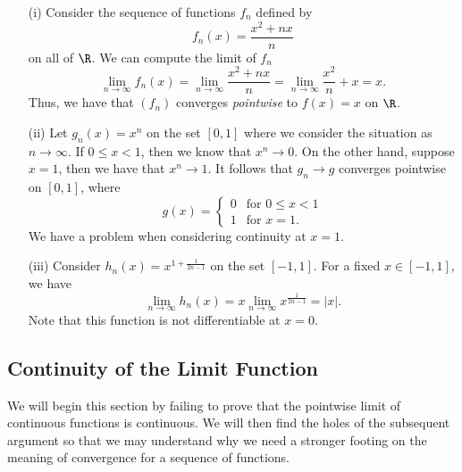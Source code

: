 \begin{ex}
\begin{enumerate}
    \item[(i)] Consider the sequence of functions \( f_n  \) defined by 
        \[  f_n(x) = \frac{ x^2 + nx  }{ n } \]
        on all of \( \R  \). We can compute the limit of \( f_n  \)
        \[  \lim_{ n \to \infty  } f_n(x) = \lim_{ n \to \infty  } \frac{ x^2 + nx  }{ n  } = \lim_{ n \to \infty  } \frac{ x^2  }{ n } + x  = x. \] Thus, we have that \( (f_n) \) converges \textit{pointwise} to \( f(x) = x  \) on \( \R  \).
    \item[(ii)] Let \( g_n(x) = x^n  \) on the set \( [0,1]  \) where we consider the situation as \( n \to \infty  \). If \( 0 \leq x < 1  \), then we know that \( x^n \to 0  \). On the other hand, suppose \( x = 1  \), then we have that \( x^n \to 1  \). It follows that \( g_n \to g  \) converges pointwise on \( [0,1] \), where 
        \[  g(x) = 
        \begin{cases}
            0 &\text{for } 0 \leq x < 1 \\
            1 &\text{for } x = 1.
        \end{cases} \]
        We have a problem when considering continuity at \( x = 1  \).
    \item[(iii)] Consider \( h_n(x) = x^{1+ \frac{ 1 }{ 2n - 1  } } \) on the set \( [-1,1]  \). For a fixed \( x \in [-1,1]  \), we have 
        \[  \lim_{ n \to \infty  } h_n(x) = x \lim_{ n \to \infty  } x^{\frac{ 1 }{ 2n-1 } }  = | x  |.\]
        Note that this function is not differentiable at \( x = 0  \).
\end{enumerate}
\end{ex}

\subsection{Continuity of the Limit Function}

We will begin this section by failing to prove that the pointwise limit of continuous functions is continuous. We will then find the holes of the subsequent argument so that we may understand why we need a stronger footing on the meaning of convergence for a sequence of functions.


